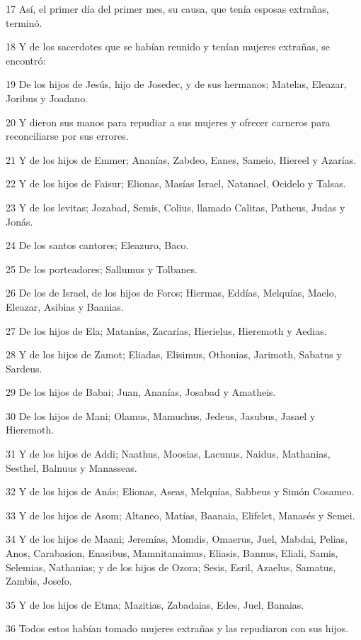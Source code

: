 \par 17 Así, el primer día del primer mes, su causa, que tenía esposas extrañas, terminó.
\par 18 Y de los sacerdotes que se habían reunido y tenían mujeres extrañas, se encontró:
\par 19 De los hijos de Jesús, hijo de Josedec, y de sus hermanos; Matelas, Eleazar, Joribus y Joadano.
\par 20 Y dieron sus manos para repudiar a sus mujeres y ofrecer carneros para reconciliarse por sus errores.
\par 21 Y de los hijos de Emmer; Ananías, Zabdeo, Eanes, Sameio, Hiereel y Azarías.
\par 22 Y de los hijos de Faisur; Elionas, Masías Israel, Natanael, Ocidelo y Talsas.
\par 23 Y de los levitas; Jozabad, Semis, Colius, llamado Calitas, Patheus, Judas y Jonás.
\par 24 De los santos cantores; Eleazuro, Baco.
\par 25 De los porteadores; Sallumus y Tolbanes.
\par 26 De los de Israel, de los hijos de Foros; Hiermas, Eddías, Melquías, Maelo, Eleazar, Asibias y Baanias.
\par 27 De los hijos de Ela; Matanías, Zacarías, Hierielus, Hieremoth y Aedias.
\par 28 Y de los hijos de Zamot; Eliadas, Elisimus, Othonias, Jarimoth, Sabatus y Sardeus.
\par 29 De los hijos de Babai; Juan, Ananías, Josabad y Amatheis.
\par 30 De los hijos de Mani; Olamus, Mamuchus, Jedeus, Jasubus, Jasael y Hieremoth.
\par 31 Y de los hijos de Addi; Naathus, Moosias, Lacunus, Naidus, Mathanias, Sesthel, Balnuus y Manasseas.
\par 32 Y de los hijos de Anás; Elionas, Aseas, Melquías, Sabbeus y Simón Cosameo.
\par 33 Y de los hijos de Asom; Altaneo, Matías, Baanaia, Elifelet, Manasés y Semei.
\par 34 Y de los hijos de Maani; Jeremías, Momdis, Omaerus, Juel, Mabdai, Pelias, Anos, Carabasion, Enasibus, Mamnitanaimus, Eliasis, Bannus, Eliali, Samis, Selemias, Nathanias; y de los hijos de Ozora; Sesis, Esril, Azaelus, Samatus, Zambis, Josefo.
\par 35 Y de los hijos de Etma; Mazitias, Zabadaias, Edes, Juel, Banaias.
\par 36 Todos estos habían tomado mujeres extrañas y las repudiaron con sus hijos.
